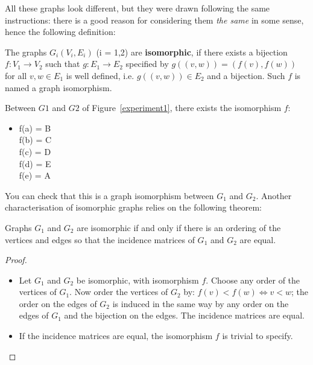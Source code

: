 All these graphs look different, but they were drawn following the
same instructions: there is a good reason for considering them {\em
the same} in some sense, hence the following definition:

\begin{definition}\label{isomorfegraphs}
\textup{The graphs $G_{i}(V_{i},E_{i})$ (i = 1,2) are
    \textbf{isomorphic}, if there exists a bijection $f: V_{1}
\rightarrow V_{2}$ such that $g: E_{1} \rightarrow E_{2}$ specified by
$g((v,w)) = (f(v),f(w))$ for all $v,w \in E_{1}$ is well defined,
i.e. $g((v,w)) \in E_{2}$ and a bijection.  Such $f$ is named a
graph isomorphism.}
\end{definition}

Between $G1$ and $G2$ of Figure~\ref{experiment1}, there exists
the isomorphism $f$:
\begin{itemize}
\item[]
f(a) = B\\
f(b) = C\\
f(c) = D\\
f(d) = E\\
f(e) = A
\end{itemize}

You can check that this is a graph isomorphism between $G_{1}$ and
$G_{2}$. Another characterisation of isomorphic graphs relies on the
following theorem:

\begin{theorem}
Graphs $G_{1}$ and $G_{2}$ are isomorphic if and only if there is an
ordering of the vertices and edges so that the incidence matrices of
$G_{1}$ and $G_{2}$ are equal.
\end{theorem}
\begin{proof}
~\\
\begin{itemize}
\item
Let $G_{1}$ and $G_{2}$ be isomorphic, with isomorphism $f$.
Choose any order of the vertices of $G_{1}$. Now order the vertices of
$G_{2}$ by: $f(v) < f(w) \Leftrightarrow v < w$; the order on the
edges of $G_{2}$ is induced in the same way by any order on the edges
of $G_{1}$ and the bijection on the edges. The incidence matrices are
equal.
\item If the incidence matrices are equal, the isomorphism $f$ is
trivial to specify.
\end{itemize}
\end{proof}

